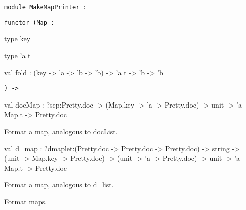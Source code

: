 \documentclass[11pt]{article}
\begin{document}
\begin{ocamldoccode}
{\tt{module }}{\tt{MakeMapPrinter}}{\tt{ : }}\end{ocamldoccode}
\label{module:Pretty.MakeMapPrinter}

{\tt{functor (}}{\tt{Map}}{\tt{ : }}\begin{ocamldocsigend}


\label{type:Pretty.MakeMapPrinter.key}\begin{ocamldoccode}
type key 
\end{ocamldoccode}


\label{type:Pretty.MakeMapPrinter.t}\begin{ocamldoccode}
type 'a t 
\end{ocamldoccode}


\label{val:Pretty.MakeMapPrinter.fold}\begin{ocamldoccode}
val fold : (key -> 'a -> 'b -> 'b) ->
  'a t -> 'b -> 'b
\end{ocamldoccode}
\end{ocamldocsigend}
{\tt{) -> }}\begin{ocamldocsigend}


\label{val:Pretty.MakeMapPrinter.docMap}\begin{ocamldoccode}
val docMap :
  ?sep:Pretty.doc ->
  (Map.key -> 'a -> Pretty.doc) -> unit -> 'a Map.t -> Pretty.doc
\end{ocamldoccode}
\begin{ocamldocdescription}
Format a map, analogous to docList.


\end{ocamldocdescription}


\label{val:Pretty.MakeMapPrinter.d-underscoremap}\begin{ocamldoccode}
val d_map :
  ?dmaplet:(Pretty.doc -> Pretty.doc -> Pretty.doc) ->
  string ->
  (unit -> Map.key -> Pretty.doc) ->
  (unit -> 'a -> Pretty.doc) -> unit -> 'a Map.t -> Pretty.doc
\end{ocamldoccode}
\begin{ocamldocdescription}
Format a map, analogous to d\_list.


\end{ocamldocdescription}
\end{ocamldocsigend}




\begin{ocamldocdescription}
Format maps.


\end{ocamldocdescription}
\end{document}
